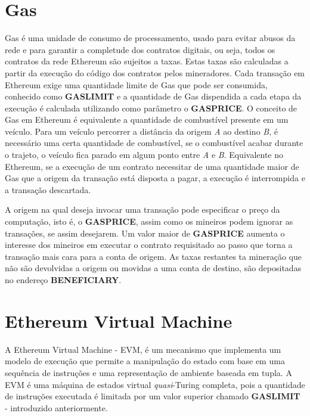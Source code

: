 \documentclass[tcc,capa]{texufpel}
\begin{document}

	\section{Gas}
	
	Gas é uma unidade de consumo de processamento, usado para evitar abusos da rede e para garantir a completude dos contratos digitais, ou seja, todos os contratos da rede Ethereum são sujeitos a taxas. Estas taxas são calculadas a partir da execução do código dos contratos pelos mineradores. Cada transação em Ethereum exige uma quantidade limite de Gas que pode ser consumida, conhecido como \textbf{GASLIMIT} e a quantidade de Gas dispendida a cada etapa da execução é calculada utilizando como parâmetro o \textbf{GASPRICE}. O conceito de Gas em Ethereum é equivalente a quantidade de combustível presente em um veículo. Para um veículo percorrer a distância da origem \textit{A} ao destino \textit{B}, é necessário uma certa quantidade de combustível, se o combustível acabar durante o trajeto, o veículo fica parado em algum ponto entre \textit{A} e  \textit{B}. Equivalente no Ethereum, se a execução de um contrato necessitar de uma quantidade maior de Gas que a origem da transação está disposta a pagar, a execução é interrompida e a transação descartada.
	
	A origem na qual deseja invocar uma transação pode especificar o preço da computação, isto é, o \textbf{GASPRICE}, assim como os mineiros podem ignorar as transações, se assim desejarem. Um valor maior de \textbf{GASPRICE} aumenta o interesse dos mineiros em executar o contrato requisitado ao passo que torna a transação mais cara para a conta de origem. As taxas restantes ta mineração que não são devolvidas a origem ou movidas a uma conta de destino, são depositadas no endereço \textbf{BENEFICIARY}.

    
	\section{Ethereum Virtual Machine}
	
	A Ethereum Virtual Machine - EVM, é um mecanismo que implementa um modelo de execução que permite a manipulação do estado com base em uma sequência de instruções e uma representação de ambiente baseada em tupla. A EVM é uma máquina de estados virtual \textit{quasi}-Turing completa, pois a quantidade de instruções executada é limitada por um valor superior chamado \textbf{GASLIMIT} - introduzido anteriormente.
	
\end{document}

